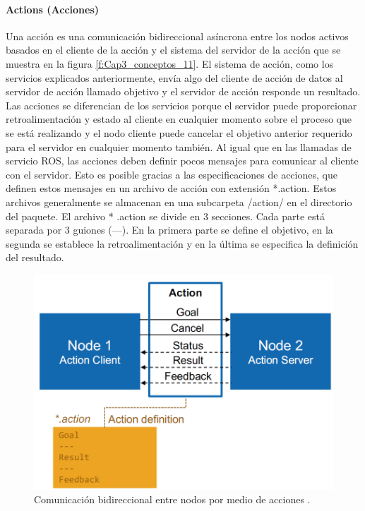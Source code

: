                \newpage

            \paragraph{ Actions (Acciones)}
                    Una acción es una comunicación bidireccional asíncrona entre los nodos activos basados en el cliente de la acción y el sistema del servidor de la acción que se muestra en la figura \eqref{f:Cap3_conceptos_11}. El sistema de acción, como los servicios explicados anteriormente, envía algo del cliente de acción de datos al servidor de acción llamado objetivo y el servidor de acción responde un resultado. Las acciones se diferencian de los servicios porque el servidor puede proporcionar retroalimentación y estado al cliente en cualquier momento sobre el proceso que se está realizando y el nodo cliente puede cancelar el objetivo anterior requerido para el servidor en cualquier momento también.
                    Al igual que en las llamadas de servicio ROS, las acciones deben definir pocos mensajes para comunicar al cliente con el servidor. Esto es posible gracias a las especificaciones de acciones, que definen estos mensajes en un archivo de acción con extensión *.action. Estos archivos generalmente se almacenan en una subcarpeta /action/ en el directorio del paquete.
                    El archivo * .action se divide en 3 secciones. Cada parte está separada por 3 guiones (---). En la primera parte se define el objetivo, en la segunda se establece la retroalimentación y en la última se especifica la definición del resultado.

            \begin{figure}[htb]
                \centering
                \includegraphics[width=0.7\linewidth]{Main/Chapter3/Images3/action_diagram.png}
                \caption{Comunicación bidireccional entre nodos por medio de acciones \cite{rosmaster_diagram}.}
                \label{f:Cap3_conceptos_11}
            \end{figure}             

